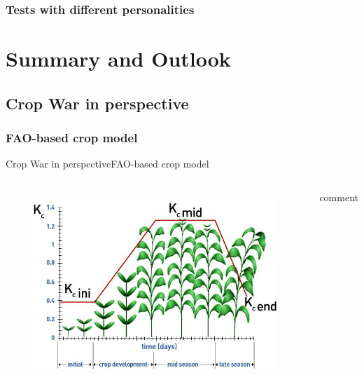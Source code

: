 \documentclass[10pt, aspectratio=169]{beamer}
\def\abb{Tests with different personalities}
\def\b{Summary and Outlook}
\def\ba{Crop War in perspective}
\def\baa{FAO-based crop model}
\begin{document}
\subsubsection{\abb}

\section{\b}



\subsection{\ba}
\subsubsection{\baa}

\begin{frame}{\ba}{\baa}
    \begin{columns}
      \centering
        \begin{figure}
         \includegraphics[width=\textwidth]{Figures/Crop-coefficients-Kc-and-growing-period-of-tomato-source-Allen-et-al-1998.png}
         \label{fig:y equals x}
        \end{figure}
        comment
    \end{columns}
\end{frame}
\end{document}
